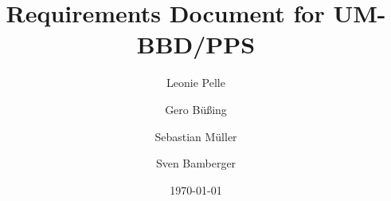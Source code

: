 \documentclass{book}
\title{Requirements Document for UM-BBD/PPS}
\author{Leonie Pelle \and Gero B\"u{\ss}ing \and Sebastian M\"uller \and Sven Bamberger}
\date{\today}
\begin{document}

\maketitle


\printglossaries

\tableofcontents




\end{document}
